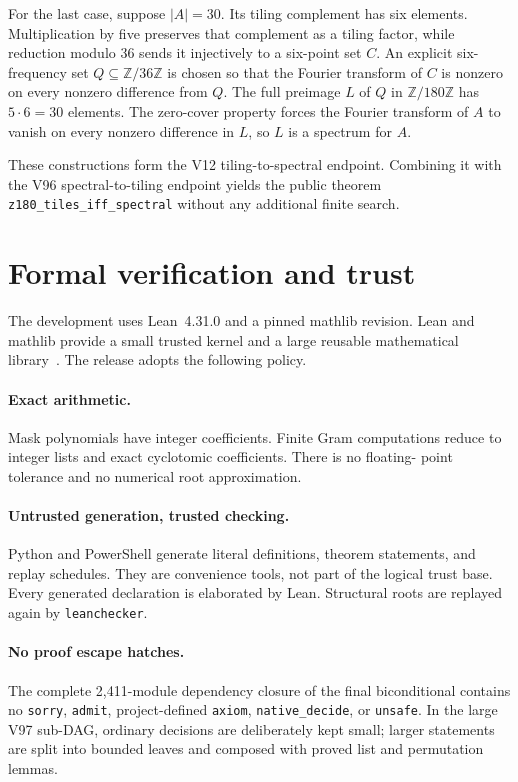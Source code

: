 \documentclass[10pt,twocolumn]{article}
\theoremstyle{definition}
\theoremstyle{remark}
\newcommand{\Z}{\mathbb Z}
\newcommand{\Zmod}[1]{\Z/#1\Z}
\begin{document}
For the last case, suppose $|A|=30$.  Its tiling complement has six elements.
Multiplication by five preserves that complement as a tiling factor, while
reduction modulo $36$ sends it injectively to a six-point set $C$.  An explicit
six-frequency set $Q\subseteq\Zmod{36}$ is chosen so that the Fourier transform
of $C$ is nonzero on every nonzero difference from $Q$.  The full preimage
$L$ of $Q$ in $\Zmod{180}$ has $5\cdot6=30$ elements.  The zero-cover property
forces the Fourier transform of $A$ to vanish on every nonzero difference in
$L$, so $L$ is a spectrum for $A$.

These constructions form the V12 tiling-to-spectral endpoint.  Combining it
with the V96 spectral-to-tiling endpoint yields the public theorem
\texttt{z180\_tiles\_iff\_spectral} without any additional finite search.

\section{Formal verification and trust}

The development uses Lean~4.31.0 and a pinned mathlib revision.  Lean and
mathlib provide a small trusted kernel and a large reusable mathematical
library~\cite{deMouraUllrich2021,Mathlib2020}.  The release adopts the following
policy.

\paragraph{Exact arithmetic.}
Mask polynomials have integer coefficients.  Finite Gram computations reduce
to integer lists and exact cyclotomic coefficients.  There is no floating-
point tolerance and no numerical root approximation.

\paragraph{Untrusted generation, trusted checking.}
Python and PowerShell generate literal definitions, theorem statements, and
replay schedules.  They are convenience tools, not part of the logical trust
base.  Every generated declaration is elaborated by Lean.  Structural roots
are replayed again by \texttt{leanchecker}.

\paragraph{No proof escape hatches.}
The complete 2,411-module dependency closure of the final biconditional
contains no \texttt{sorry}, \texttt{admit}, project-defined \texttt{axiom},
\texttt{native\_decide}, or \texttt{unsafe}.  In the large V97 sub-DAG,
ordinary decisions are deliberately kept small; larger statements are split
into bounded leaves and composed with proved list and permutation lemmas.
\end{document}
